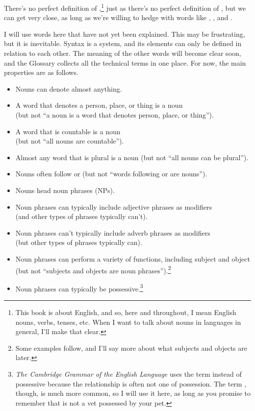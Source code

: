 There's no perfect definition of ,\footnote{This book is about English, and so, here and throughout, I mean English nouns, verbs, tenses, etc. When I want to talk about nouns in languages in general, I'll make that clear.} just as there's no perfect definition of , but we can get very close, as long as we're willing to hedge with words like , , and .

I will use words here that have not yet been explained. This may be frustrating, but it is inevitable. Syntax is a system, and its elements can only be defined in relation to each other. The meaning of the other words will become clear soon, and the Glossary collects all the technical terms in one place. For now, the main properties are as follows.

\begin{itemize}[noitemsep]
    \item Nouns can denote almost anything.
    \item A word that denotes a person, place, or thing is a noun \\(but not \enquote{a noun is a word that denotes person, place, or thing}).
    \item A word that is countable is a noun \\(but not \enquote{all nouns are countable}).
    \item Almost any word that is plural is a noun (but not \enquote{all nouns can be plural}).
    \item Nouns often follow  or  (but not \enquote{words following  or  are nouns}).
    \item Nouns head noun phrases (NPs).
    \item Noun phrases can typically include adjective phrases as modifiers \\(and other types of phrases typically can't).
    \item Noun phrases can't typically include adverb phrases as modifiers \\(but other types of phrases typically can).
    \item {}Noun phrases can perform a variety of functions, including subject and object (but not \enquote{subjects and objects are noun phrases}).\footnote{Some examples follow, and I'll say more about what subjects and objects are later.}
    \item {}Noun phrases can typically be possessive.\footnote{\textit{The Cambridge Grammar of the English Language} uses the term  instead of possessive because the relationship is often not one of possession. The term , though, is much more common, so I will use it here, as long as you promise to remember that  is not a vet possessed by your pet.}
\end{itemize}

